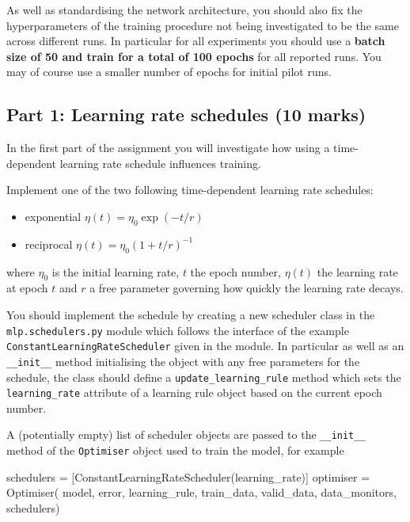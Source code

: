 \documentclass[11pt,]{article}
\newenvironment{Shaded}{}{}
\newcommand{\NormalTok}[1]{{#1}}
\begin{document}
As well as standardising the network architecture, you should also fix
the hyperparameters of the training procedure not being investigated to
be the same across different runs. In particular for all experiments you
should use a \textbf{batch size of 50 and train for a total of 100
epochs} for all reported runs. You may of course use a smaller number of
epochs for initial pilot runs.

\subsection{Part 1: Learning rate schedules (10
marks)}\label{part-1-learning-rate-schedules-10-marks}

In the first part of the assignment you will investigate how using a
time-dependent learning rate schedule influences training.

Implement one of the two following time-dependent learning rate
schedules:

\begin{itemize}
\itemsep1pt\parskip0pt
\item
  exponential $\eta(t) = \eta_0 \exp\left(-t / r\right)$
\item
  reciprocal $\eta(t) = \eta_0  \left(1 + t / r\right)^{-1}$
\end{itemize}

where $\eta_0$ is the initial learning rate, $t$ the epoch number,
$\eta(t)$ the learning rate at epoch $t$ and $r$ a free parameter
governing how quickly the learning rate decays.

You should implement the schedule by creating a new scheduler class in
the \texttt{mlp.schedulers.py} module which follows the interface of the
example \texttt{ConstantLearningRateScheduler} given in the module. In
particular as well as an \texttt{\_\_init\_\_} method initialising the
object with any free parameters for the schedule, the class should
define a \texttt{update\_learning\_rule} method which sets the
\texttt{learning\_rate} attribute of a learning rule object based on the
current epoch number.

A (potentially empty) list of scheduler objects are passed to the
\texttt{\_\_init\_\_} method of the \texttt{Optimiser} object used to
train the model, for example

\begin{Shaded}
\begin{Highlighting}[]
\NormalTok{schedulers = [ConstantLearningRateScheduler(learning_rate)]}
\NormalTok{optimiser = Optimiser(}
    \NormalTok{model, error, learning_rule, train_data,}
    \NormalTok{valid_data, data_monitors, schedulers)}
\end{Highlighting}
\end{Shaded}
\end{document}
